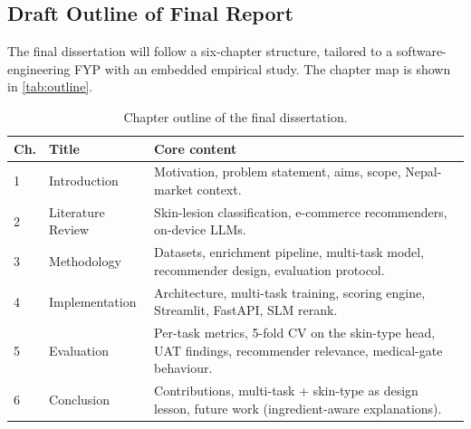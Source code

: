 \documentclass[11pt,a4paper]{article}
\begin{document}
\subsection{Draft Outline of Final Report}

The final dissertation will follow a six-chapter structure, tailored
to a software-engineering FYP with an embedded empirical study. The
chapter map is shown in \autoref{tab:outline}.

\begin{table}[!ht]
  \centering
  \caption{Chapter outline of the final dissertation.}
  \label{tab:outline}
  \begin{tabularx}{\linewidth}{@{}p{0.7cm} p{3.4cm} X@{}}
    \toprule
    \textbf{Ch.} & \textbf{Title} & \textbf{Core content} \\
    \midrule
    1 & Introduction       & Motivation, problem statement, aims, scope, Nepal-market context. \\
    2 & Literature Review  & Skin-lesion classification, e-commerce recommenders, on-device LLMs. \\
    3 & Methodology        & Datasets, enrichment pipeline, multi-task model, recommender design, evaluation protocol. \\
    4 & Implementation     & Architecture, multi-task training, scoring engine, Streamlit, FastAPI, SLM rerank. \\
    5 & Evaluation         & Per-task metrics, 5-fold CV on the skin-type head, UAT findings, recommender relevance, medical-gate behaviour. \\
    6 & Conclusion         & Contributions, multi-task + skin-type as design lesson, future work (ingredient-aware explanations). \\
    \bottomrule
  \end{tabularx}
\end{table}
\end{document}
